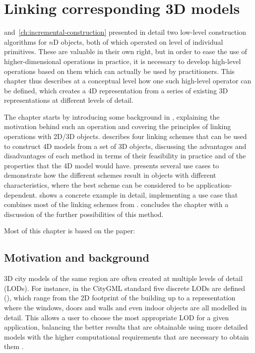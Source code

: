 
\chapter{Linking corresponding 3D models}
\label{ch:linking-lods}

 and~\ref{ch:incremental-construction} presented in detail two low-level construction algorithms for $n$D objects, both of which operated on level of individual primitives.
These are valuable in their own right, but in order to ease the use of higher-dimensional operations in practice, it is necessary to develop high-level operations based on them which can actually be used by practitioners.
This chapter thus describes at a conceptual level how one such high-level operator can be defined, which creates a 4D representation from a series of existing 3D representations at different levels of detail.

The chapter starts by introducing some background in , explaining the motivation behind such an operation and covering the principles of linking operations with 2D/3D objects.
 describes four linking schemes that can be used to construct 4D models from a set of 3D objects, discussing the advantages and disadvantages of each method in terms of their feasibility in practice and of the properties that the 4D model would have.
 presents several use cases to demonstrate how the different schemes result in objects with different characteristics, where the best scheme can be considered to be application-dependent.
 shows a concrete example in detail, implementing a use case that combines most of the linking schemes from .
 concludes the chapter with a discussion of the further possibilities of this method.

Most of this chapter is based on the paper:
\begin{itemize}
\paperijgind%
\end{itemize}

\section{Motivation and background}
\label{se:linking-background}

3D city models of the same region are often created at multiple levels of detail (LODs).
For instance, in the CityGML standard \citep{CityGML2} five discrete LODs are defined (), which range from the 2D footprint of the building up to a representation where the windows, doors and walls and even indoor objects are all modelled in detail.
This allows a user to choose the most appropriate LOD for a given application, balancing the better results that are obtainable using more detailed models with the higher computational requirements that are necessary to obtain them \citep{Biljecki14}.

